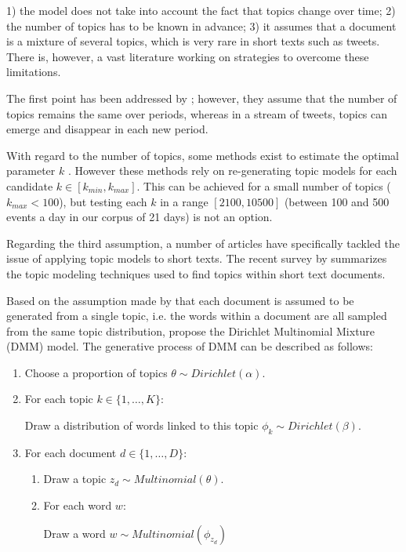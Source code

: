 	1) the model does not take into account the fact that topics change over time; 2) the number of topics has to be known in advance; 3) it assumes that a document is a mixture of several topics, which is very rare in short texts such as tweets. There is, however, a vast literature working on strategies to overcome these limitations.
	
	The first point has been addressed by \citet{blei_dynamic_2006}; however, they assume that the number of topics remains the same over periods, whereas in a stream of tweets, topics can emerge and disappear in each new period.
	
	With regard to the number of topics, some methods exist to estimate the optimal parameter $k$  \citep{brunet_metagenes_2004,griffiths_finding_2004,arun_finding_2010,greene_how_2014}. However these methods rely on re-generating topic models for each candidate $k \in [k_{min}, k_{max}]$. This can be achieved for a small number of topics ($k_{max} < 100$), but testing each $k$ in a range $[2100, 10500]$ (between 100 and 500 events a day in our corpus of 21 days) is not an option. 
	
	Regarding the third assumption, a number of articles have specifically tackled the issue of applying topic models to short texts. The recent survey by \citet{likhitha975detailed} summarizes the topic modeling techniques used to find topics within short text documents.
    
    Based on the assumption made by \citet{nigam2000text} that each document is assumed to be generated from a single topic, i.e. the words within a document are all sampled from the same topic distribution, \citet{yin_dirichlet_2014} propose the Dirichlet Multinomial Mixture (DMM) model. The generative process of DMM can be described as follows: 
    \begin{center}
        	\begin{enumerate}
	 	\item Choose a proportion of topics $\theta \sim Dirichlet(\alpha)$.
	 	\item For each topic $k \in \lbrace1,\ldots,K\rbrace$:
	 	 
			Draw a distribution of words linked to this topic $\phi_k \sim Dirichlet(\beta)$.
		\item For each document $d \in \lbrace1,\ldots,D\rbrace$:
		\begin{enumerate}
		    \item Draw a topic $z_d \sim Multinomial(\theta)$.
		    \item For each word $w$:
		    
		    Draw a word $w \sim Multinomial(\phi_{z_d})$
		    
		\end{enumerate}	 	  
	 \end{enumerate}
    \end{center}

